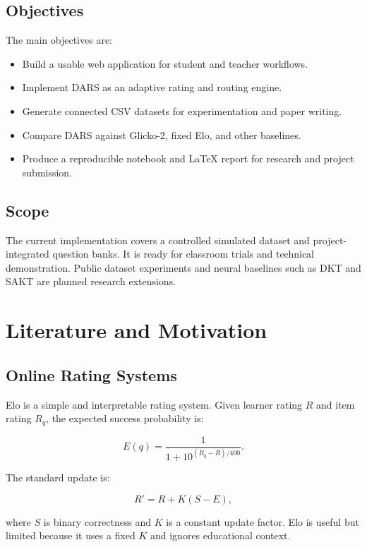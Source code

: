\documentclass[12pt,a4paper]{report}
\begin{document}
\section{Objectives}
The main objectives are:

\begin{itemize}[leftmargin=*]
  \item Build a usable web application for student and teacher workflows.
  \item Implement DARS as an adaptive rating and routing engine.
  \item Generate connected CSV datasets for experimentation and paper writing.
  \item Compare DARS against Glicko-2, fixed Elo, and other baselines.
  \item Produce a reproducible notebook and LaTeX report for research and project submission.
\end{itemize}

\section{Scope}
The current implementation covers a controlled simulated dataset and project-integrated question banks. It is ready for classroom trials and technical demonstration. Public dataset experiments and neural baselines such as DKT and SAKT are planned research extensions.

\chapter{Literature and Motivation}
\section{Online Rating Systems}
Elo is a simple and interpretable rating system. Given learner rating $R$ and item rating $R_q$, the expected success probability is:

\begin{equation}
E(q)=\frac{1}{1+10^{(R_q-R)/400}}.
\end{equation}

The standard update is:

\begin{equation}
R' = R + K(S-E),
\end{equation}

where $S$ is binary correctness and $K$ is a constant update factor. Elo is useful but limited because it uses a fixed $K$ and ignores educational context.
\end{document}
